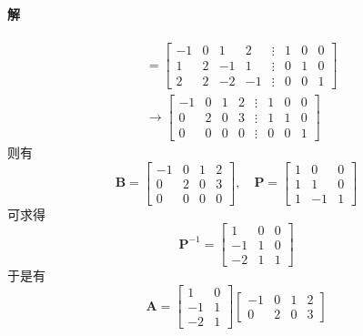 \documentclass[12pt, a4paper, oneside, fontset=none]{ctexart}
\begin{document}
\paragraph*{解}
\begin{align*}
    [\bm{A} \vdots \bm{I}] & = \begin{bmatrix}
                                   -1 & 0 & 1  & 2  & \vdots & 1 & 0 & 0 \\
                                   1  & 2 & -1 & 1  & \vdots & 0 & 1 & 0 \\
                                   2  & 2 & -2 & -1 & \vdots & 0 & 0 & 1
                               \end{bmatrix} \\
                           & \to \begin{bmatrix}
                                     -1 & 0 & 1 & 2 & \vdots & 1 & 0 & 0 \\
                                     0  & 2 & 0 & 3 & \vdots & 1 & 1 & 0 \\
                                     0  & 0 & 0 & 0 & \vdots & 0 & 0 & 1
                                 \end{bmatrix}
\end{align*}
则有
$$
    \bm{B} = \begin{bmatrix}
        -1 & 0 & 1 & 2 \\
        0  & 2 & 0 & 3 \\
        0  & 0 & 0 & 0
    \end{bmatrix}, \quad
    \bm{P} = \begin{bmatrix}
        1 & 0  & 0 \\
        1 & 1  & 0 \\
        1 & -1 & 1
    \end{bmatrix}
$$
可求得
$$
    \bm{P}^{-1} = \begin{bmatrix}
        1  & 0 & 0 \\
        -1 & 1 & 0 \\
        -2 & 1 & 1
    \end{bmatrix}
$$
于是有
$$
    \bm{A} = \begin{bmatrix}
        1  & 0 \\
        -1 & 1 \\
        -2 & 1
    \end{bmatrix} \begin{bmatrix}
        -1 & 0 & 1 & 2 \\
        0  & 2 & 0 & 3
    \end{bmatrix}
$$
\end{document}
